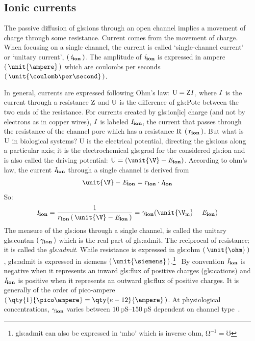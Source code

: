 \documentclass[class={myRUCProject}, crop=false]{standalone}
\begin{document}
\subsection{Ionic currents}
The passive diffusion of \glspl{gls:ion} through an open channel implies a movement of charge through some resistance. Current comes from the movement of charge.
When focusing on a single channel, the current is called `single-channel current' or `unitary current', \(\left(\,\mathit{i}_\mathbf{ion}\,\right)\). The amplitude of \(\mathit{i}_\mathbf{ion}\) is expressed in ampere \(\br{\unit{\ampere}}\) which are coulombs per seconds \(\br{\unit{\coulomb\per\second}}\). 

In general, currents are expressed following Ohm's law: \(\mathrm{U}=\mathrm{Z}\mathit{I}\), where \(\mathit{I}\) is the current through a resistance \(\mathrm{Z}\) and \(\mathrm{U}\) is the difference of \gls{gls:Pote} between the two ends of the resistance. 
For currents created by \gls{gls:ion}[ic] charge (and not by electrons as in copper wires), \(\mathit{I}\) is labeled \(\mathit{I}_\mathbf{ion}\), the current that passes through the resistance of the channel pore which has a resistance \(\mathrm{R}\) \(\left(\,\mathrm{r}_\mathbf{ion}\,\right)\). 
%
But what is \(\mathrm{U}\) in biological systems? 
%
\unit{U} is the electrical potential, directing the \glspl{gls:ion} along a particular axis; it is the electrochemical \gls{gls:grad} for the considered \gls{gls:ion} and is also called the driving potential: \(\rmm{U}=(\unit{\V} - \equi\ion)\). According to ohm's law, the current \(\mathit{I}_\mathbf{ion}\) through a single channel is derived from 
\begin{equation}
  \unit{\V} - \equi\ion = r\ion \cdot \curr\ion
\end{equation}
So:
\begin{equation}\label{eq:cur2con}
  \curr\ion= \frac{1}{r\ion\br{\unit{\V} - \equi\ion}} = \ucon\ion(\unit{\V\membrane} - \equi\ion)
\end{equation}
The measure of the \glspl{gls:ion} through a single channel, is called the unitary \gls{gls:contan} \(\left(\,\gamma_\mathbf{ion}\,\right)\) which is the real part of \gls{gls:admit}. 
The reciprocal of resistance; it is called the \textit{\gls{gls:admit}}.
While resistance is expressed in \gls{gls:ohm} \(\br{\unit{\ohm}}\), \gls{gls:admit} is expressed in siemens \(\br{\unit{\siemens}}\).\footnote{\Gls{gls:admit} can also be expressed in `mho' which is inverse ohm, \(\unit{\ohm}^{-1} = \unit{\mho}\)}~
By convention \(\mathit{I}_\mathbf{ion}\) is negative when it represents an inward \gls{gls:flux} of positive charges (\glspl{gls:cation}) and \(\mathit{I}_\mathbf{ion}\) is positive when it represents an outward \gls{gls:flux} of positive charges. It is generally of the order of pico-ampere \(\br{\qty{1}{\pico\ampere}=\qty{e-12}{\ampere}}\). At physiological concentrations, \(\gamma_\mathbf{ion}\) varies between \(\qtyrange{10}{150}{\pico\siemens}\) dependent on channel type~\cite{Hammond2015ch4}.
\end{document}
